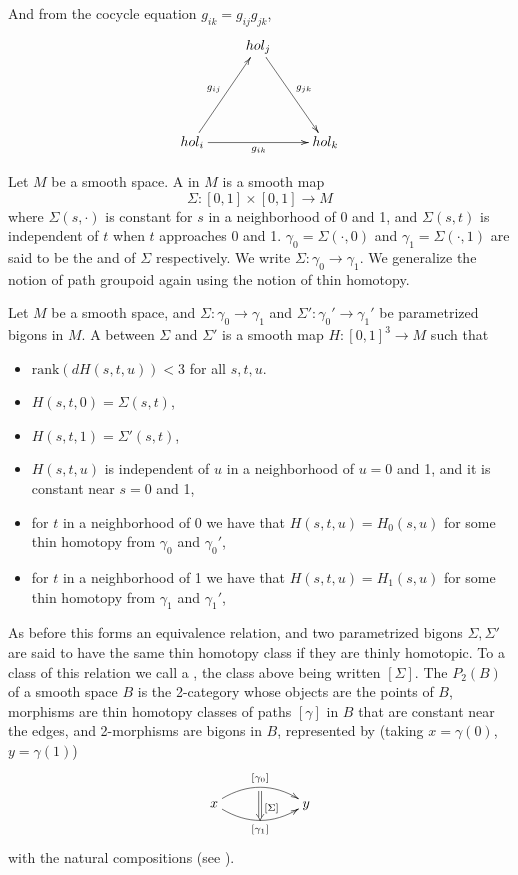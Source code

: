 And from the cocycle equation $g_{ik}=g_{ij}g_{jk}$,
\[
\xymatrix{ & hol_j \ar[ddr]^{g_{jk}} &\\
\\
hol_i \ar[uur]^{g_{ij}} \ar[rr]_{g_{ik}} & & hol_k}
\]

\begin{definition}
 Let $M$ be a smooth space. A  in $M$ is a smooth map\[
                                                                                 \Sigma:[0,1]\times [0,1]\rightarrow M
                                                                                \]
where $\Sigma(s,\cdotp)$ is constant for $s$ in a neighborhood of 0 and 1, and $\Sigma(s,t)$ is independent of $t$ when $t$ approaches 0 and 1. $\gamma_0=\Sigma(\cdotp,0)$ and $\gamma_1=\Sigma(\cdotp,1)$ are said to be the  and  of $\Sigma$ respectively. We write $\Sigma:\gamma_0\rightarrow \gamma_1$.
We generalize the notion of path groupoid again using the notion of thin homotopy.
\end{definition}
\begin{definition}
 Let $M$ be a smooth space, and $\Sigma:\gamma_0\rightarrow \gamma_1$ and $\Sigma':\gamma_0'\rightarrow \gamma_1'$ be parametrized bigons in $M$. A  between $\Sigma$ and $\Sigma'$ is a smooth map $H:[0,1]^3\rightarrow M$ such that
\begin{itemize}
 \item $\text{rank}(dH(s,t,u))< 3$ for all $s,t,u$.
 \item $H(s,t,0)=\Sigma(s,t)$,
 \item $H(s,t,1)=\Sigma'(s,t)$,
\item $H(s,t,u)$ is independent of $u$ in a neighborhood of $u=0$ and 1, and it is constant near $s=0$ and 1,
\item for $t$ in a neighborhood of 0 we have that $H(s,t,u)=H_0(s,u)$ for some thin homotopy from $\gamma_0$ and $\gamma_0'$,
\item for $t$ in a neighborhood of 1 we have that $H(s,t,u)=H_1(s,u)$ for some thin homotopy from $\gamma_1$ and $\gamma_1'$,
\end{itemize}
As before this forms an equivalence relation, and two parametrized bigons $\Sigma,\Sigma'$ are said to have the same thin homotopy class if they are thinly homotopic. To a class of this relation we call a , the class above being written $[\Sigma]$.
The  $P_2(B)$ of a smooth space $B$ is the 2-category whose objects are the points of $B$, morphisms are thin homotopy classes of paths $[\gamma]$ in $B$ that are constant near the edges, and 2-morphisms are bigons in $B$, represented by (taking $x=\gamma(0)$, $y=\gamma(1)$)
\[
 \xymatrix{ x \ar@/^1pc/[rr]^{[\gamma_0]}_{}="0"
           \ar@/_1pc/[rr]_{[\gamma_1]}="1"
           \ar@{=>}"0";"1"^{[\Sigma]} && y}
\]
with the natural compositions (see \cite{baez-2004}).
\end{definition}

